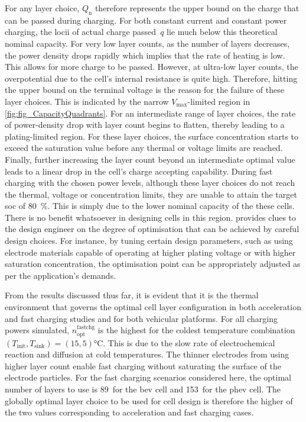 For any layer  choice, $Q_\text{n}$ therefore represents the upper  bound on the
charge  that can  be  passed  during charging.  For  both  constant current  and
constant power  charging, the locii of  actual charge passed~$q$ lie  much below
this theoretical nominal  capacity. For very low layer counts,  as the number of
layers decreases, the power density drops rapidly which implies that the rate of
heating is low. This allows for more  charge to be passed. However, at ultra-low
layer counts, the  overpotential due to the cell's internal  resistance is quite
high.  Therefore,  hitting the  upper  bound  on  the  terminal voltage  is  the
reason  for  the failure  of  these  layer choices.  This  is  indicated by  the
narrow $V_\text{max}$-limited region in \cref{fig:fig_CapacityQuadrants}. For an
intermediate range of  layer choices, the rate of power-density  drop with layer
count begins to flatten, thereby leading  to a plating-limited region. For these
layer choices, the  surface concentration starts to exceed  the saturation value
before any  thermal or voltage  limits are reached. Finally,  further increasing
the layer count beyond  an intermediate optimal value leads to  a linear drop in
the cell's  charge accepting  capability. During fast  charging with  the chosen
power levels, although these layer choices  do not reach the thermal, voltage or
concentration  limits,  they  are  unable  to attain  the  target  \gls{soc}  of
\SI{80}{\percent}. This is simply due to the lower nominal capacity of the these
cells.  There is  no  benefit  whatsoever in  designing  cells  in this  region.
 provides  clues to  the design engineer  on the
degree  of optimisation  that can  be achieved  by careful  design choices.  For
instance, by tuning certain design parameters, such as using electrode materials
capable  of  operating at  higher  plating  voltage  or with  higher  saturation
concentration, the optimisation  point can be appropriately adjusted  as per the
application's demands.


From  the results  discussed thus  far, it  is evident  that it  is the  thermal
environment  that  governs   the  optimal  cell  layer   configuration  in  both
acceleration and fast charging studies and for both vehicular platforms. For all
charging powers simulated, $n^\text{fastchg}_\text{opt}$  is the highest for the
coldest temperature  combination \mbox{$(T_\text{init},T_\text{sink}) =  (15, 5)
\si{\degreeCelsius}$}. This is due to  the slow rate of electrochemical reaction
and diffusion  at cold  temperatures. The thinner  electrodes from  using higher
layer count enable fast charging without saturating the surface of the electrode
particles. For the  fast charging scenarios considered here,  the optimal number
of layers to use  is 89~for the \gls{bev} cell and  153~for the \gls{phev} cell.
The globally optimal  layer choice to be  used for cell design  is therefore the
higher of the two values corresponding  to acceleration and fast charging cases.

